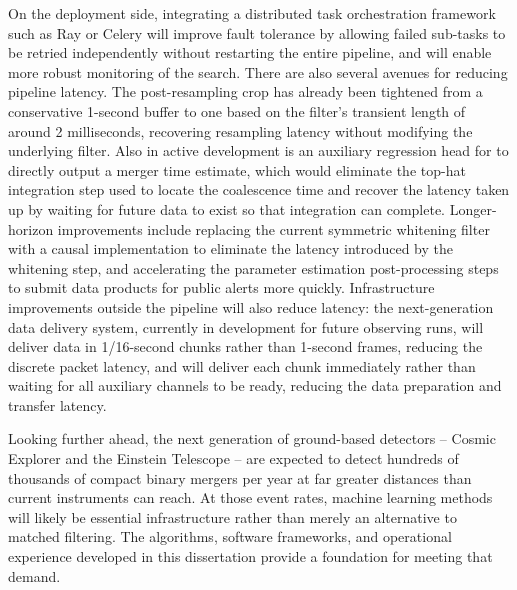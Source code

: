 On the deployment side, integrating a distributed task orchestration framework such as Ray or Celery will improve fault tolerance by allowing failed sub-tasks to be retried independently without restarting the entire pipeline, and will enable more robust monitoring of the search.
There are also several avenues for reducing pipeline latency.
The post-resampling crop has already been tightened from a conservative 1-second buffer to one based on the filter's transient length of around 2 milliseconds, recovering resampling latency without modifying the underlying filter.
Also in active development is an auxiliary regression head for \aframe to directly output a merger time estimate, which would eliminate the top-hat integration step used to locate the coalescence time and recover the latency taken up by waiting for future data to exist so that integration can complete.
Longer-horizon improvements include replacing the current symmetric whitening filter with a causal implementation to eliminate the latency introduced by the whitening step, and accelerating the parameter estimation post-processing steps to submit data products for public alerts more quickly.
Infrastructure improvements outside the pipeline will also reduce latency: the next-generation data delivery system, currently in development for future observing runs, will deliver data in 1/16-second chunks rather than 1-second frames, reducing the discrete packet latency, and will deliver each chunk immediately rather than waiting for all auxiliary channels to be ready, reducing the data preparation and transfer latency.

Looking further ahead, the next generation of ground-based detectors -- Cosmic Explorer and the Einstein Telescope -- are expected to detect hundreds of thousands of compact binary mergers per year at far greater distances than current instruments can reach.
At those event rates, machine learning methods will likely be essential infrastructure rather than merely an alternative to matched filtering.
The algorithms, software frameworks, and operational experience developed in this dissertation provide a foundation for meeting that demand.

